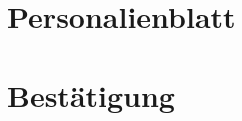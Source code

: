 \documentclass[abstracton,liststotoc,bibtotoc]{scrreprt}
\begin{document}
    \appendix
    
    \chapter{Personalienblatt}
    
    
    \chapter{Bestätigung}
    
    
    \listoffigures

    \listoftables
    
    
    
    
\end{document}
